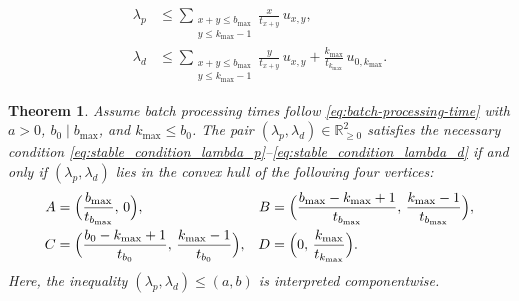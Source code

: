 \documentclass[10pt,a4paper]{amsart}
\newtheorem{theorem}{Theorem}
\begin{document}
\begin{align}
    \lambda_p &\le \sum_{\substack{x+y \le b_{\max} \\ y \le k_{\max}-1}} \frac{x}{t_{x+y}}\, u_{x,y}, \label{eq:stable_condition_lambda_p} \\
    \lambda_d &\le \sum_{\substack{x+y \le b_{\max} \\ y \le k_{\max}-1}} \frac{y}{t_{x+y}}\, u_{x,y} + \frac{k_{\max}}{t_{k_{\max}}}\, u_{0,k_{\max}}. \label{eq:stable_condition_lambda_d}
\end{align}

\begin{theorem} \label{convex_hull}
Assume batch processing times follow \cref{eq:batch-processing-time} with $a > 0$, $b_0 \mid b_{\max}$, and $k_{\max} \le b_0$. The pair $(\lambda_p, \lambda_d) \in \mathbb{R}^2_{\ge 0}$ satisfies the necessary condition \cref{eq:stable_condition_lambda_p}--\cref{eq:stable_condition_lambda_d} if and only if $(\lambda_p, \lambda_d)$ lies in the convex hull of the following four vertices:
\begin{align*}
    A &= \Bigl(\frac{b_{\max}}{t_{b_{\max}}},\, 0\Bigr), &
    B &= \Bigl(\frac{b_{\max}-k_{\max}+1}{t_{b_{\max}}},\, \frac{k_{\max}-1}{t_{b_{\max}}}\Bigr), \\
    C &= \Bigl(\frac{b_0-k_{\max}+1}{t_{b_0}},\, \frac{k_{\max}-1}{t_{b_0}}\Bigr), &
    D &= \Bigl(0,\, \frac{k_{\max}}{t_{k_{\max}}}\Bigr).
\end{align*}
Here, the inequality $(\lambda_p, \lambda_d) \le (a, b)$ is interpreted componentwise.
\end{theorem}
\end{document}
